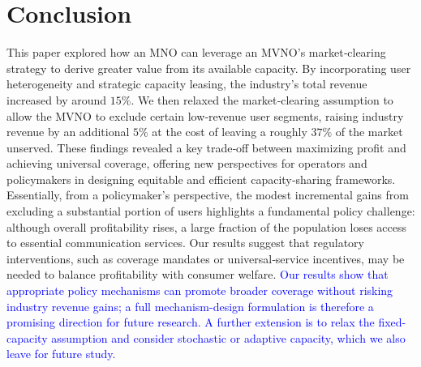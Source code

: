 \documentclass[12pt, draftclsnofoot, onecolumn]{IEEEtran}
\begin{document}
		\section{Conclusion} \label{secV}
		This paper explored how an MNO can leverage an MVNO’s market‐clearing strategy to derive greater value from its available capacity. By incorporating user heterogeneity and strategic capacity leasing, the industry's total revenue increased by around $15\%$. We then relaxed the market‐clearing assumption to allow the MVNO to exclude certain low‐revenue user segments, raising industry revenue by an additional $5\%$ at the cost of leaving a roughly $37\%$ of the market unserved. 
		These findings revealed a key trade‐off between maximizing profit and achieving universal coverage, offering new perspectives for operators and policymakers in designing equitable and efficient capacity‐sharing frameworks. 
		Essentially, from a policymaker’s perspective, the modest incremental gains from excluding a substantial portion of users highlights a fundamental policy challenge: although overall profitability rises, a large fraction of the population loses access to essential communication services. Our results suggest that regulatory interventions, such as coverage mandates or universal‐service incentives, may be needed to balance profitability with consumer welfare. \textcolor{blue}{Our results show that appropriate policy mechanisms can promote broader coverage without risking industry revenue gains; a full mechanism-design formulation is therefore a promising direction for future research. A further extension is to relax the fixed-capacity assumption and consider stochastic or adaptive capacity, which we also leave for future study.
		}
		
		
			\vspace{-.5cm}
		
		
		
		
		
		
		
		
		
		
		
		
		
		
		
		
	
\end{document}
